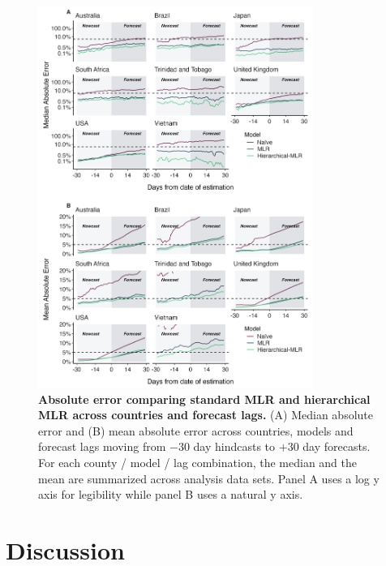 \begin{figure}[h!]
	\centering
	\includegraphics[width=0.8\textwidth]{figures/model_comp_PooledMLR.png}
	\caption{\textbf{Absolute error comparing standard MLR and hierarchical MLR across countries and forecast lags.}
	(A) Median absolute error and (B) mean absolute error across countries, models and forecast lags moving from $-30$ day hindcasts to $+30$ day forecasts.
	For each county / model / lag combination, the median and the mean are summarized across analysis data sets.
	Panel A uses a log y axis for legibility while panel B uses a natural y axis.
	}
	\label{fig:Fig7}
\end{figure}

\section{Discussion}


